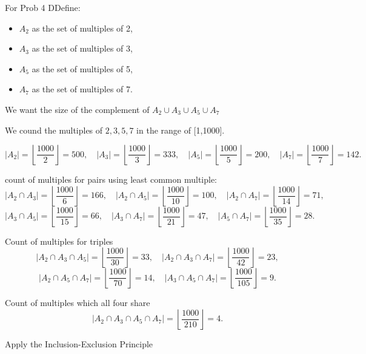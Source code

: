 \documentclass{report}
\begin{document}

\begin{RemarkWithLily}{For Prob 4}
  DDefine:

  \begin{itemize}
      \item \(A_2\) as the set of multiples of 2,
      \item \(A_3\) as the set of multiples of 3,
      \item \(A_5\) as the set of multiples of 5,
      \item \(A_7\) as the set of multiples of 7.
  \end{itemize}
  
  We want the size of the complement of \(A_2 \cup A_3 \cup A_5 \cup A_7\)
  
  We cound the multiples of \(2,3,5,7 \) in the range of [1,1000].

  \[
  |A_2| = \left\lfloor \frac{1000}{2} \right\rfloor = 500, \quad 
  |A_3| = \left\lfloor \frac{1000}{3} \right\rfloor = 333, \quad 
  |A_5| = \left\lfloor \frac{1000}{5} \right\rfloor = 200, \quad 
  |A_7| = \left\lfloor \frac{1000}{7} \right\rfloor = 142.
  \]
  
  count of multiples for pairs using least common multiple:
  \[
  |A_2 \cap A_3| = \left\lfloor \frac{1000}{6} \right\rfloor = 166, \quad
  |A_2 \cap A_5| = \left\lfloor \frac{1000}{10} \right\rfloor = 100, \quad
  |A_2 \cap A_7| = \left\lfloor \frac{1000}{14} \right\rfloor = 71, \] 
  \[ 
  |A_3 \cap A_5| = \left\lfloor \frac{1000}{15} \right\rfloor = 66, \quad
  |A_3 \cap A_7| = \left\lfloor \frac{1000}{21} \right\rfloor = 47, \quad
  |A_5 \cap A_7| = \left\lfloor \frac{1000}{35} \right\rfloor = 28.
  \]
  
  Count of multiples for triples
  \[
  |A_2 \cap A_3 \cap A_5| = \left\lfloor \frac{1000}{30} \right\rfloor = 33, \quad
  |A_2 \cap A_3 \cap A_7| = \left\lfloor \frac{1000}{42} \right\rfloor = 23, \] 
  \[ 
  |A_2 \cap A_5 \cap A_7| = \left\lfloor \frac{1000}{70} \right\rfloor = 14, \quad
  |A_3 \cap A_5 \cap A_7| = \left\lfloor \frac{1000}{105} \right\rfloor = 9.
  \]
  
  Count of multiples which all four share 
  \[
  |A_2 \cap A_3 \cap A_5 \cap A_7| = \left\lfloor \frac{1000}{210} \right\rfloor = 4.
  \]
  
  Apply the Inclusion-Exclusion Principle
  

\end{RemarkWithLily}
\end{document}
